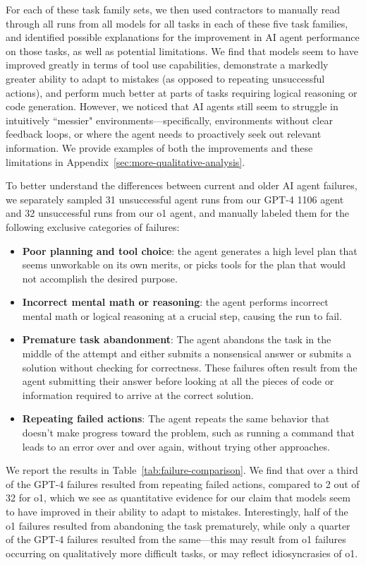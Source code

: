 \documentclass{article}
\begin{document}
For each of these task family sets, we then used contractors to manually read through all runs from all models for all tasks in each of these five task families, and identified possible explanations for the improvement in AI agent performance on those tasks, as well as potential limitations. We find that models seem to have improved greatly in terms of tool use capabilities, demonstrate a markedly greater ability to adapt to mistakes (as opposed to repeating unsuccessful actions), and perform much better at parts of tasks requiring logical reasoning or code generation. However, we noticed that AI agents still seem to struggle in intuitively ``messier" environments---specifically, environments without clear feedback loops, or where the agent needs to proactively seek out relevant information. We provide examples of both the improvements and these limitations in Appendix~\ref{sec:more-qualitative-analysis}.

To better understand the differences between current and older AI agent failures, we separately sampled 31 unsuccessful agent runs from our GPT-4 1106 agent and 32 unsuccessful runs from our o1 agent, and manually labeled them for the following exclusive categories of failures:
\begin{itemize}
    \item \textbf{Poor planning and tool choice}: the agent generates a high level plan that seems unworkable on its own merits, or picks tools for the plan that would not accomplish the desired purpose. 
    \item \textbf{Incorrect mental math or reasoning}: the agent performs incorrect mental math or logical reasoning at a crucial step, causing the run to fail. 
    \item \textbf{Premature task abandonment}: The agent abandons the task in the middle of the attempt and either submits a nonsensical answer or submits a solution without checking for correctness. These failures often result from the agent submitting their answer before looking at all the pieces of code or information required to arrive at the correct solution. 
    \item \textbf{Repeating failed actions}: The agent repeats the same behavior that doesn’t make progress toward the problem, such as running a command that leads to an error over and over again, without trying other approaches.
\end{itemize}
We report the results in Table~\ref{tab:failure-comparison}. We find that over a third of the GPT-4 failures resulted from repeating failed actions, compared to 2 out of 32 for o1, which we see as quantitative evidence for our claim that models seem to have improved in their ability to adapt to mistakes. Interestingly, half of the o1 failures resulted from abandoning the task prematurely, while only a quarter of the GPT-4 failures resulted from the same---this may result from o1 failures occurring on qualitatively more difficult tasks, or may reflect idiosyncrasies of o1. 
\end{document}

